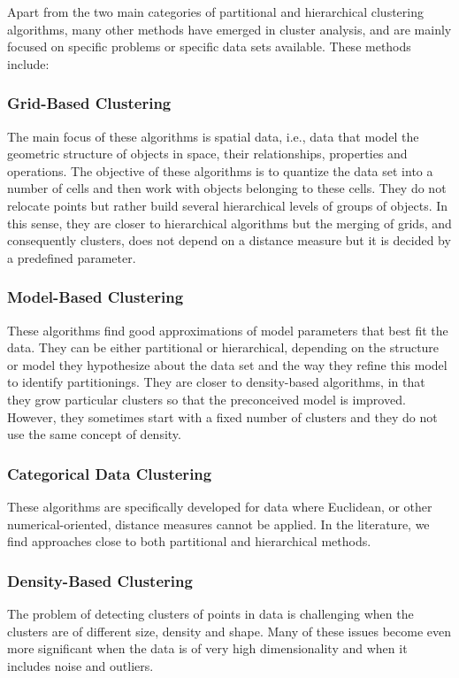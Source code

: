 Apart from the two main categories of  partitional and hierarchical clustering algorithms, many other methods
have emerged in cluster analysis, and are mainly focused on specific problems or specific data sets
available. These methods include:

\subsubsection{Grid-Based Clustering} The main focus of these algorithms is spatial data, i.e., data that model the geometric
structure of objects in space, their relationships, properties and operations. The objective of
these algorithms is to quantize the data set into a number of cells and then work with objects belonging
to these cells. They do not relocate points but rather build several hierarchical levels of groups of
objects. In this sense, they are closer to hierarchical algorithms but the merging of grids, and consequently
clusters, does not depend on a distance measure but it is decided by a predefined parameter.

\subsubsection{Model-Based Clustering} These algorithms find good approximations of model parameters that best fit
the data. They can be either partitional or hierarchical, depending on the structure or model they
hypothesize about the data set and the way they refine this model to identify partitionings. They
are closer to density-based algorithms, in that they grow particular clusters so that the preconceived
model is improved. However, they sometimes start with a fixed number of clusters and they do not
use the same concept of density.
\subsubsection{Categorical Data Clustering} These algorithms are specifically developed for data where Euclidean, or
other numerical-oriented, distance measures cannot be applied. In the literature, we find approaches
close to both partitional and hierarchical methods.

\subsubsection{Density-Based Clustering} 
The problem of detecting clusters of points in data is challenging when the clusters are of 
different size, density and shape. Many of these issues become even more significant when 
the data is of very high dimensionality and when it includes noise and outliers. 

